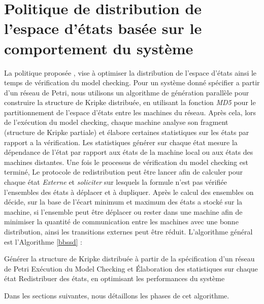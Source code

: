 
\section{Politique de distribution de l’espace d’états basée sur le	comportement du système}
 
La politique proposée \emph{\BbSSD{}}, vise à optimiser la distribution de l’espace d’états ainsi le temps de vérification du model checking. Pour un système donné spécifier a partir d'un réseau de Petri, nous utilisons un algorithme de génération parallèle pour construire la structure de Kripke distribuée, en utilisant la fonction \emph{MD5} pour le partitionnement de l’espace d’états entre les machines du réseau. Après cela, lors de l'exécution du model checking, chaque machine analyse son fragment (structure de Kripke partiale) et élabore certaines statistiques sur les états par rapport a la vérification. Les statistiques  générer sur chaque état mesure la dépendance de l'état par rapport aux états de la machine local ou aux états des machines distantes. Une fois le processus de vérification du model checking est terminé, Le protocole de redistribution peut être lancer afin de calculer pour chaque état \emph{Externe} et \emph{soliciter} sur lesquels la formule n'est pas vérifiée l'ensembles des états à déplacer et à dupliquer. Après le calcul des ensembles on décide, sur la base de l'écart minimum et maximum des états a stocké sur la machine, si l'ensemble peut être déplacer ou rester dans une machine afin de minimiser la quantité de communication entre les machines avec une bonne distribution, ainsi les transitions externes peut être réduit.
L’algorithme général est l'Algorithme \ref{bbssd} :\\
\begin{algorithm}[H]\label{bbssd}
	\SetAlgoLined
	 Générer la structure de Kripke distribuée à partir de la spécification d'un réseau de Petri\;
	 Exécution du Model Checking et Élaboration des statistiques sur chaque état\;
	 Redistribuer des états, en optimisant les performances du système\;	  
	\caption{\BbSSD{}}
\end{algorithm}

Dans les sections suivantes, nous détaillons les phases de cet algorithme.

